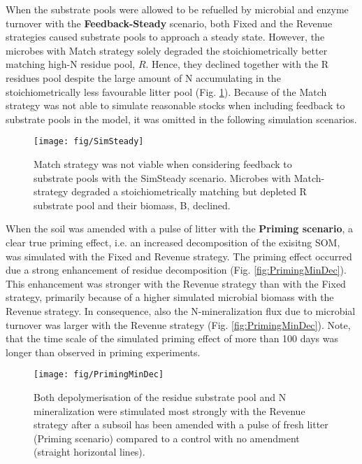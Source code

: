 When the substrate pools were allowed to be refuelled by microbial and enzyme
turnover with the \textbf{Feedback-Steady} scenario, both Fixed and the Revenue
strategies caused substrate pools to approach a steady state.
However, the microbes with Match strategy solely degraded the stoichiometrically
better matching high-N residue pool, $R$. Hence, they declined together with the
R residues pool despite the large amount of N accumulating in the
stoichiometrically less favourable litter pool (Fig. \ref{fig:SimSteady}).
Because of the Match strategy was not able to simulate reasonable stocks when
including feedback to substrate pools in the model, it was omitted in the
following simulation scenarios.

\begin{figure}[t]
\vspace*{2mm}
\begin{center} 
\texttt{[image: fig/SimSteady]} 
\end{center}
\caption{
Match strategy was not viable when considering feedback to
substrate pools with the SimSteady scenario. Microbes with
Match-strategy degraded a stoichiometrically matching but depleted R substrate
pool and their biomass, B, declined.
\label{fig:SimSteady}} 
\end{figure}

When the soil was amended with a pulse of litter with the \textbf{Priming
scenario}, a clear true priming effect, i.e. an increased decomposition of the
exisitng SOM, was simulated with the Fixed and Revenue strategy.
The priming effect occurred due a strong enhancement of residue decomposition
(Fig. \ref{fig:PrimingMinDec}). This
enhancement was stronger with the Revenue strategy than with the Fixed strategy,
primarily because of a higher simulated microbial biomass with the Revenue
strategy. In consequence, also the N-mineralization flux due to microbial
turnover was larger with the Revenue strategy (Fig. \ref{fig:PrimingMinDec}).
Note, that the time scale of the simulated priming effect of more than 100 days
was longer than observed in priming experiments.

\begin{figure}[t] \vspace*{2mm}
\begin{center}
\texttt{[image: fig/PrimingMinDec]}
\end{center}
\caption{
Both depolymerisation of the residue substrate pool and N
mineralization were stimulated most strongly with the Revenue strategy after a
subsoil has been amended with a pulse of fresh litter (Priming scenario)
compared to a control with no amendment (straight horizontal lines).
\label{fig:PrimingMinDecDec}}
\end{figure}

